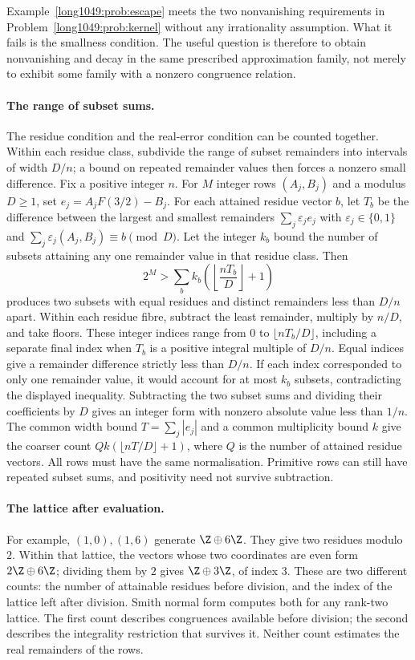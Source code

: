 Example~\ref{long1049:prob:escape} meets the two nonvanishing
requirements in Problem~\ref{long1049:prob:kernel} without any
irrationality assumption. What it fails is the smallness condition.
The useful question is therefore to obtain nonvanishing and decay in
the same prescribed approximation family, not merely to exhibit some
family with a nonzero congruence relation.

\paragraph{The range of subset sums.}
The residue condition and the real-error condition can be counted
together. Within each residue class, subdivide the range of subset
remainders into intervals of width $D/n$; a bound on repeated
remainder values then forces a nonzero small difference. Fix a
positive integer $n$. For $M$ integer rows $(A_j,B_j)$ and a modulus
$D\ge1$, set $e_j=A_jF(3/2)-B_j$. For each attained residue vector $b$,
let $T_b$ be the difference between the largest and smallest remainders
$\sum_j\varepsilon_je_j$ with $\varepsilon_j\in\{0,1\}$ and
$\sum_j\varepsilon_j(A_j,B_j)\equiv b\pmod D$. Let the integer $k_b$
bound the number of subsets attaining any one remainder value in that
residue class. Then
\[
 2^M>\sum_b k_b\left(\left\lfloor\frac{nT_b}{D}\right\rfloor+1\right)
\]
produces two subsets with equal residues and distinct remainders
less than $D/n$ apart. Within each residue fibre, subtract the least
remainder, multiply by $n/D$, and take floors. These integer indices range
from $0$ to $\lfloor nT_b/D\rfloor$, including a separate final index
when $T_b$ is a positive integral multiple of $D/n$. Equal indices
give a remainder difference strictly less than $D/n$. If each index
corresponded to only one remainder value, it would account for at most
$k_b$ subsets, contradicting the displayed inequality. Subtracting the
two subset sums and dividing their coefficients by $D$ gives an integer
form with nonzero absolute value less than $1/n$. The common width bound
$T=\sum_j|e_j|$ and a common multiplicity bound $k$ give the coarser
count $Qk(\lfloor nT/D\rfloor+1)$, where $Q$ is the number of attained
residue vectors. All rows must have the same normalisation. Primitive
rows can still have repeated subset sums, and positivity need not
survive subtraction.

\paragraph{The lattice after evaluation.}
For example, $(1,0),(1,6)$ generate $\Z\oplus6\Z$. They give two
residues modulo $2$. Within that lattice, the vectors whose two
coordinates are even form $2\Z\oplus6\Z$; dividing them by $2$ gives
$\Z\oplus3\Z$, of index $3$. These are two different counts: the number of attainable residues
before division, and the index of the lattice left after division.
Smith normal form computes both for any rank-two lattice. The
first count describes congruences available before division; the
second describes the integrality restriction that survives it.
Neither count estimates the real remainders of the rows.

